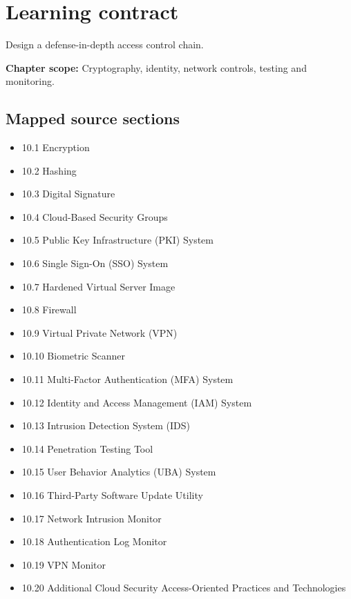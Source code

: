 \documentclass[10pt,letterpaper]{article}
\begin{document}
\sourceStatement
\tableofcontents
\newpage
\section{Learning contract}
\begin{takeaway}
Design a defense-in-depth access control chain.
\end{takeaway}
\textbf{Chapter scope:} Cryptography, identity, network controls, testing and monitoring.\\
\subsection{Mapped source sections}
\begin{itemize}
\item 10.1 Encryption
\item 10.2 Hashing
\item 10.3 Digital Signature
\item 10.4 Cloud-Based Security Groups
\item 10.5 Public Key Infrastructure (PKI) System
\item 10.6 Single Sign-On (SSO) System
\item 10.7 Hardened Virtual Server Image
\item 10.8 Firewall
\item 10.9 Virtual Private Network (VPN)
\item 10.10 Biometric Scanner
\item 10.11 Multi-Factor Authentication (MFA) System
\item 10.12 Identity and Access Management (IAM) System
\item 10.13 Intrusion Detection System (IDS)
\item 10.14 Penetration Testing Tool
\item 10.15 User Behavior Analytics (UBA) System
\item 10.16 Third-Party Software Update Utility
\item 10.17 Network Intrusion Monitor
\item 10.18 Authentication Log Monitor
\item 10.19 VPN Monitor
\item 10.20 Additional Cloud Security Access-Oriented Practices and Technologies
\end{itemize}
\end{document}
